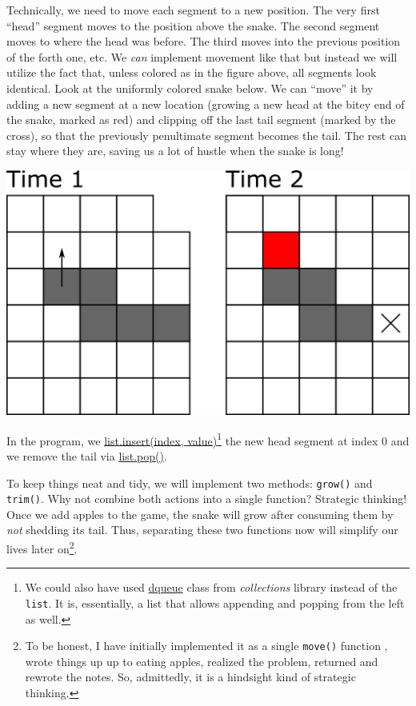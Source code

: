 \documentclass[
]{book}
\begin{document}
Technically, we need to move each segment to a new position. The very first ``head'' segment moves to the position above the snake. The second segment moves to where the head was before. The third moves into the previous position of the forth one, etc. We \emph{can} implement movement like that but instead we will utilize the fact that, unless colored as in the figure above, all segments look identical. Look at the uniformly colored snake below. We can ``move'' it by adding a new segment at a new location (growing a new head at the bitey end of the snake, marked as red) and clipping off the last tail segment (marked by the cross), so that the previously penultimate segment becomes the tail. The rest can stay where they are, saving us a lot of hustle when the snake is long!

\includegraphics[width=14.36in]{images/snake-movement-2}

In the program, we \href{https://docs.python.org/3/tutorial/datastructures.html\#more-on-lists}{list.insert(index, value)}\footnote{We could also have used \href{https://docs.python.org/3/library/collections.html\#collections.deque}{dqueue} class from \emph{collections} library instead of the \texttt{list}. It is, essentially, a list that allows appending and popping from the left as well.} the new head segment at index 0 and we remove the tail via \href{https://docs.python.org/3/tutorial/datastructures.html\#more-on-lists}{list.pop()}.

To keep things neat and tidy, we will implement two methods: \texttt{grow()} and \texttt{trim()}. Why not combine both actions into a single function? Strategic thinking! Once we add apples to the game, the snake will grow after consuming them by \emph{not} shedding its tail. Thus, separating these two functions now will simplify our lives later on\footnote{To be honest, I have initially implemented it as a single \texttt{move()} function , wrote things up up to eating apples, realized the problem, returned and rewrote the notes. So, admittedly, it is a hindsight kind of strategic thinking.}.
\end{document}
